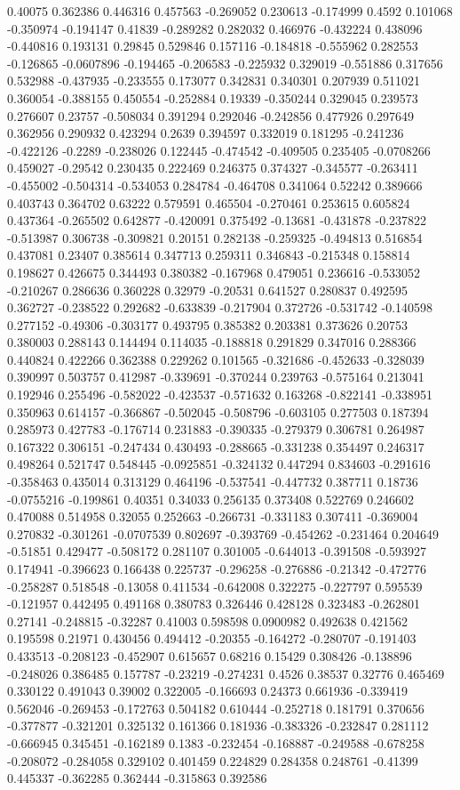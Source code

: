 0.40075 0.362386 0.446316 0.457563 -0.269052 0.230613 -0.174999 0.4592 0.101068 -0.350974 -0.194147 0.41839 -0.289282 0.282032 0.466976 -0.432224 0.438096 -0.440816 0.193131 0.29845 0.529846 0.157116 -0.184818 -0.555962 0.282553 -0.126865 -0.0607896 -0.194465 -0.206583 -0.225932 0.329019 -0.551886 0.317656 0.532988 -0.437935 -0.233555 0.173077 0.342831 0.340301 0.207939 0.511021 0.360054 -0.388155 0.450554 -0.252884 0.19339 -0.350244 0.329045 0.239573 0.276607 0.23757 -0.508034 0.391294 0.292046 -0.242856 0.477926 0.297649 0.362956 0.290932 0.423294 0.2639 0.394597 0.332019 0.181295 -0.241236 -0.422126 -0.2289 -0.238026 0.122445 -0.474542 -0.409505 0.235405 -0.0708266 0.459027 -0.29542 0.230435 0.222469 0.246375 0.374327 -0.345577 -0.263411 -0.455002 -0.504314 -0.534053 0.284784 -0.464708 0.341064 0.52242 0.389666 0.403743 0.364702 0.63222 0.579591 0.465504 -0.270461 0.253615 0.605824 0.437364 -0.265502 0.642877 -0.420091 0.375492 -0.13681 -0.431878 -0.237822 -0.513987 0.306738 -0.309821 0.20151 0.282138 -0.259325 -0.494813 0.516854 0.437081 0.23407 0.385614 0.347713 0.259311 0.346843 -0.215348 0.158814 0.198627 0.426675 0.344493 0.380382 -0.167968 0.479051 0.236616 -0.533052 -0.210267 0.286636 0.360228 0.32979 -0.20531 0.641527 0.280837 0.492595 0.362727 -0.238522 0.292682 -0.633839 -0.217904 0.372726 -0.531742 -0.140598 0.277152 -0.49306 -0.303177 0.493795 0.385382 0.203381 0.373626 0.20753 0.380003 0.288143 0.144494 0.114035 -0.188818 0.291829 0.347016 0.288366 0.440824 0.422266 0.362388 0.229262 0.101565 -0.321686 -0.452633 -0.328039 0.390997 0.503757 0.412987 -0.339691 -0.370244 0.239763 -0.575164 0.213041 0.192946 0.255496 -0.582022 -0.423537 -0.571632 0.163268 -0.822141 -0.338951 0.350963 0.614157 -0.366867 -0.502045 -0.508796 -0.603105 0.277503 0.187394 0.285973 0.427783 -0.176714 0.231883 -0.390335 -0.279379 0.306781 0.264987 0.167322 0.306151 -0.247434 0.430493 -0.288665 -0.331238 0.354497 0.246317 0.498264 0.521747 0.548445 -0.0925851 -0.324132 0.447294 0.834603 -0.291616 -0.358463 0.435014 0.313129 0.464196 -0.537541 -0.447732 0.387711 0.18736 -0.0755216 -0.199861 0.40351 0.34033 0.256135 0.373408 0.522769 0.246602 0.470088 0.514958 0.32055 0.252663 -0.266731 -0.331183 0.307411 -0.369004 0.270832 -0.301261 -0.0707539 0.802697 -0.393769 -0.454262 -0.231464 0.204649 -0.51851 0.429477 -0.508172 0.281107 0.301005 -0.644013 -0.391508 -0.593927 0.174941 -0.396623 0.166438 0.225737 -0.296258 -0.276886 -0.21342 -0.472776 -0.258287 0.518548 -0.13058 0.411534 -0.642008 0.322275 -0.227797 0.595539 -0.121957 0.442495 0.491168 0.380783 0.326446 0.428128 0.323483 -0.262801 0.27141 -0.248815 -0.32287 0.41003 0.598598 0.0900982 0.492638 0.421562 0.195598 0.21971 0.430456 0.494412 -0.20355 -0.164272 -0.280707 -0.191403 0.433513 -0.208123 -0.452907 0.615657 0.68216 0.15429 0.308426 -0.138896 -0.248026 0.386485 0.157787 -0.23219 -0.274231 0.4526 0.38537 0.32776 0.465469 0.330122 0.491043 0.39002 0.322005 -0.166693 0.24373 0.661936 -0.339419 0.562046 -0.269453 -0.172763 0.504182 0.610444 -0.252718 0.181791 0.370656 -0.377877 -0.321201 0.325132 0.161366 0.181936 -0.383326 -0.232847 0.281112 -0.666945 0.345451 -0.162189 0.1383 -0.232454 -0.168887 -0.249588 -0.678258 -0.208072 -0.284058 0.329102 0.401459 0.224829 0.284358 0.248761 -0.41399 0.445337 -0.362285 0.362444 -0.315863 0.392586 